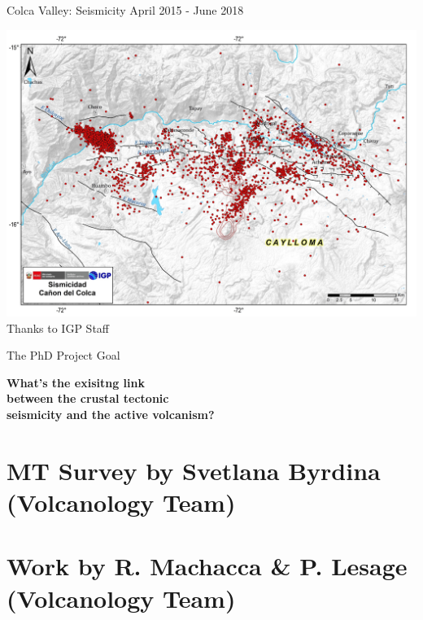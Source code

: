 \documentclass{beamer}
\begin{document}
\begin{frame}
 {Colca Valley: Seismicity April 2015 - June 2018}
 
 \includegraphics[width=1\linewidth]{images/red_colca_large.jpg}
 \\
 \hfill Thanks to IGP Staff
 
\end{frame}

\begin{frame}
 {The PhD Project Goal}
 
 \centering 
 \huge {\bf What's the exisitng link \\
 between the crustal tectonic \\ 
 seismicity and the active volcanism?}
 
 
\end{frame}




\section{MT Survey by Svetlana Byrdina \\ (Volcanology Team) }

{

}

{

}

{

}

{

}


\section{Work by R. Machacca \& P. Lesage \\ (Volcanology Team) }
\end{document}
